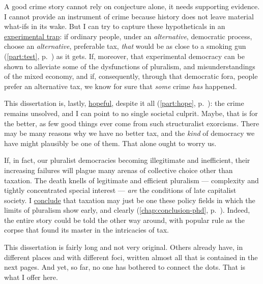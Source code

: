 A good crime story cannot rely on conjecture alone, it needs supporting evidence.
I cannot provide an instrument of crime because history does not leave material what-ifs in its wake.
But I can try to capture these hypotheticals in an \hyperref[part:test]{experimental trap}:
if ordinary %
people, under an \emph{alternative}, democratic process, choose an \emph{alternative}, preferable tax, \emph{that} would be as close to a smoking gun (\autoref{part:test}, p.~\pageref{part:test}) as it gets.
If, moreover, that experimental democracy can be shown to alleviate some of the dysfunctions of pluralism, and misunderstandings of the mixed economy, and if, consequently, through that democratic fora, people prefer an alternative tax, we know for sure that \emph{some} crime \emph{has} happened.

This dissertation is, lastly, \hyperref[part:hope]{hopeful}, despite it all (\autoref{part:hope}, p.~\pageref{part:hope}):
the crime remains unsolved, and I can point to no single societal culprit.
Maybe, that is for the better, as few good things ever come from such structuralist exorcisms.
There may be many reasons why we have no better tax, and the \emph{kind} of democracy we have might plausibly be one of them.
That alone ought to worry us.

If, in fact, our pluralist democracies becoming illegitimate and inefficient, their increasing failures will plague many arenas of collective choice other than taxation.
The death knells of legitimate and efficient pluralism --- complexity and tightly concentrated special interest --- \emph{are} the conditions of late capitalist society.
I \hyperref[chap:conclusion-phd]{conclude} that taxation may just be one these policy fields in which the limits of pluralism show early, and clearly (\autoref{chap:conclusion-phd}, p.~\pageref{chap:conclusion-phd}).
Indeed, the entire story could be told the other way around, with popular rule as the corpse that found its master in the intricacies of tax.

This dissertation is fairly long and not very original.
Others already have, in different places and with different foci, written almost all that is contained in the next pages.
And yet, so far, no one has bothered to connect the dots.
That is what I offer here.

